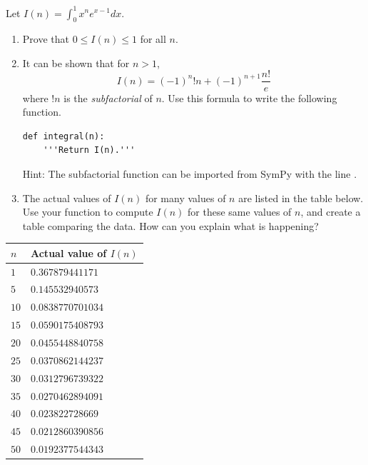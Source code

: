\begin{problem}
Let $I(n) = \int_0^1 x^n e^{x - 1} dx$.
\begin{enumerate}
\item Prove that $0 \leq I(n) \leq 1$ for all $n$.
\item It can be shown that for $n>1$, 
\[
I(n) = \left(-1\right)^{n} !n + \left(-1\right)^{n + 1} \frac{n!}{e}
\]
where $!n$ is the \emph{subfactorial} of $n$. 
Use this formula to write the following function.
\begin{lstlisting}
def integral(n):
    '''Return I(n).'''
\end{lstlisting}
Hint: The subfactorial function can be imported from SymPy with the line .
\item The actual values of $I(n)$ for many values of $n$ are listed in the table below.
Use your function  to compute $I(n)$ for these same values of $n$, and create a table comparing the data.
How can you explain what is happening?
\end{enumerate}

\begin{center}
\begin{tabular}{|l|l|}
\hline
$n$  & Actual value of $I(n)$ \\
\hline
$1$  & $0.367879441171$ \\
$5$  & $0.145532940573$ \\
$10$ & $0.0838770701034$ \\
$15$ & $0.0590175408793$ \\
$20$ & $0.0455448840758$ \\
$25$ & $0.0370862144237$ \\
$30$ & $0.0312796739322$ \\
$35$ & $0.0270462894091$ \\
$40$& $0.023822728669$ \\
$45$& $0.0212860390856$ \\
$50$ & $0.0192377544343$ \\
\hline
\end{tabular}
\end{center}

\end{problem}



